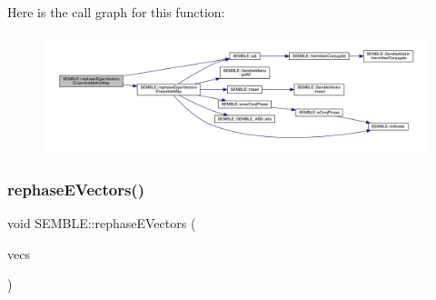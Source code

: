 Here is the call graph for this function\+:
\nopagebreak
\begin{figure}[H]
\begin{center}
\leavevmode
\includegraphics[width=350pt]{d7/dfd/namespaceSEMBLE_a6720e329f02e8313f422d94b8a416230_cgraph}
\end{center}
\end{figure}
\mbox{\label{namespaceSEMBLE_af53ad989d18f8aab4666dab37495120d}} 
\subsubsection{\texorpdfstring{rephaseEVectors()}{rephaseEVectors()}\hspace{0.1cm}{\footnotesize\ttfamily [1/2]}}
{\footnotesize\ttfamily void S\+E\+M\+B\+L\+E\+::rephase\+E\+Vectors (\begin{DoxyParamCaption}\item[{\mbox{\hyperlink{structSEMBLE_1_1SembleMatrix}{Semble\+Matrix}}$<$ double $>$ \&}]{vecs }\end{DoxyParamCaption})}

